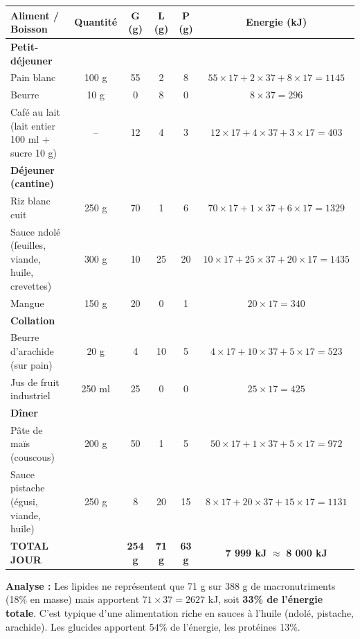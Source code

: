 \documentclass[11pt]{article}
\begin{document}
\begin{exemplebox}
\begin{center}
\begin{tabular}{|l|c|c|c|c|c|}\hline
\rowcolor{popblueL}
\textbf{Aliment / Boisson} & \textbf{Quantité} & \textbf{G (g)} & \textbf{L (g)} & \textbf{P (g)} & \textbf{Energie (kJ)} \\ \hline
\textbf{Petit-déjeuner} & & & & & \\
Pain blanc & 100 g & 55 & 2 & 8 & $55\times17 + 2\times37 + 8\times17 = 1145$ \\
Beurre & 10 g & 0 & 8 & 0 & $8\times37 = 296$ \\
Café au lait (lait entier 100 ml + sucre 10 g) & -- & 12 & 4 & 3 & $12\times17 + 4\times37 + 3\times17 = 403$ \\ \hline
\textbf{Déjeuner (cantine)} & & & & & \\
Riz blanc cuit & 250 g & 70 & 1 & 6 & $70\times17 + 1\times37 + 6\times17 = 1329$ \\
Sauce ndolé (feuilles, viande, huile, crevettes) & 300 g & 10 & 25 & 20 & $10\times17 + 25\times37 + 20\times17 = 1435$ \\
Mangue & 150 g & 20 & 0 & 1 & $20\times17 = 340$ \\ \hline
\textbf{Collation} & & & & & \\
Beurre d'arachide (sur pain) & 20 g & 4 & 10 & 5 & $4\times17 + 10\times37 + 5\times17 = 523$ \\
Jus de fruit industriel & 250 ml & 25 & 0 & 0 & $25\times17 = 425$ \\ \hline
\textbf{Dîner} & & & & & \\
Pâte de maïs (couscous) & 200 g & 50 & 1 & 5 & $50\times17 + 1\times37 + 5\times17 = 972$ \\
Sauce pistache (égusi, viande, huile) & 250 g & 8 & 20 & 15 & $8\times17 + 20\times37 + 15\times17 = 1131$ \\ \hline
\rowcolor{popcream}
\textbf{TOTAL JOUR} & & \textbf{254 g} & \textbf{71 g} & \textbf{63 g} & \textbf{7 999 kJ} $\approx$ \textbf{8 000 kJ} \\ \hline
\end{tabular}
\end{center}
\textbf{Analyse :} Les lipides ne représentent que 71 g sur 388 g de macronutriments (18\% en masse) mais apportent $71\times37 = 2627$ kJ, soit \textbf{33\% de l'énergie totale}. C'est typique d'une alimentation riche en sauces à l'huile (ndolé, pistache, arachide). Les glucides apportent 54\% de l'énergie, les protéines 13\%.
\end{exemplebox}
\end{document}
